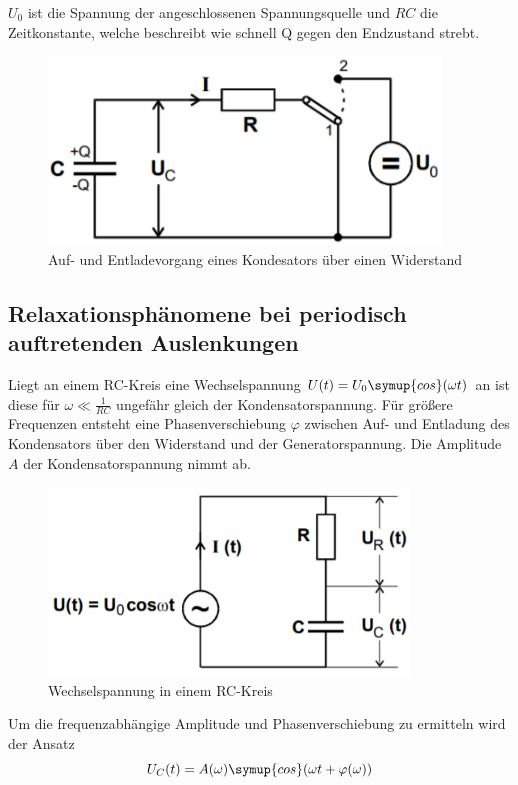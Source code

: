 $U_0$ ist die Spannung der angeschlossenen Spannungsquelle und
$RC$ die Zeitkonstante, welche beschreibt wie schnell Q gegen den Endzustand strebt.

\begin{figure}[H]
  \centering
  \includegraphics[height=5cm]{entladung.PNG}
  \caption{Auf- und Entladevorgang eines Kondesators über einen Widerstand \cite{sample}}
  \label{fig:Kondensator}
\end{figure}

\subsection{Relaxationsphänomene bei periodisch auftretenden Auslenkungen}
Liegt an einem RC-Kreis eine Wechselspannung $U(t) = U_0 \symup{cos}(\omega t)$ an ist diese
für $\omega \ll \frac{1}{RC}$ ungefähr gleich der Kondensatorspannung. Für größere
Frequenzen entsteht eine Phasenverschiebung $\varphi$ zwischen Auf- und Entladung des Kondensators
über den Widerstand und der Generatorspannung. Die Amplitude $A$ der Kondensatorspannung nimmt ab.


\begin{figure}[H]
  \centering
  \includegraphics[height=5cm]{wechselspannung.PNG}
  \caption{Wechselspannung in einem RC-Kreis \cite{sample}}
  \label{fig:wechselspannung}
\end{figure}

Um die frequenzabhängige Amplitude und Phasenverschiebung zu ermitteln wird der Ansatz
\begin{equation}
  U_C(t) = A(\omega)\symup{cos}(\omega t + \varphi(\omega))
\end{equation}

